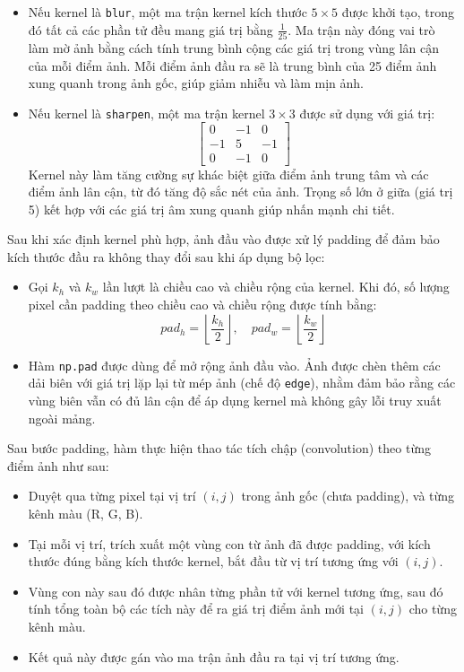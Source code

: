 \begin{itemize}
  \item Nếu kernel là \texttt{blur}, một ma trận kernel kích thước \(5 \times 5\) được khởi tạo, trong đó tất cả các phần tử đều mang giá trị bằng \(\frac{1}{25}\). Ma trận này đóng vai trò làm mờ ảnh bằng cách tính trung bình cộng các giá trị trong vùng lân cận của mỗi điểm ảnh. Mỗi điểm ảnh đầu ra sẽ là trung bình của 25 điểm ảnh xung quanh trong ảnh gốc, giúp giảm nhiễu và làm mịn ảnh.

  \item Nếu kernel là \texttt{sharpen}, một ma trận kernel \(3 \times 3\) được sử dụng với giá trị:
        \[
          \begin{bmatrix}
            0  & -1 & 0  \\
            -1 & 5  & -1 \\
            0  & -1 & 0
          \end{bmatrix}
        \]
        Kernel này làm tăng cường sự khác biệt giữa điểm ảnh trung tâm và các điểm ảnh lân cận, từ đó tăng độ sắc nét của ảnh. Trọng số lớn ở giữa (giá trị 5) kết hợp với các giá trị âm xung quanh giúp nhấn mạnh chi tiết.
\end{itemize}

Sau khi xác định kernel phù hợp, ảnh đầu vào được xử lý padding để đảm bảo kích thước đầu ra không thay đổi sau khi áp dụng bộ lọc:

\begin{itemize}
  \item Gọi \(k_h\) và \(k_w\) lần lượt là chiều cao và chiều rộng của kernel. Khi đó, số lượng pixel cần padding theo chiều cao và chiều rộng được tính bằng:
        \[
          pad_h = \left\lfloor \frac{k_h}{2} \right\rfloor, \quad pad_w = \left\lfloor \frac{k_w}{2} \right\rfloor
        \]
  \item Hàm \texttt{np.pad} được dùng để mở rộng ảnh đầu vào. Ảnh được chèn thêm các dải biên với giá trị lặp lại từ mép ảnh (chế độ \texttt{edge}), nhằm đảm bảo rằng các vùng biên vẫn có đủ lân cận để áp dụng kernel mà không gây lỗi truy xuất ngoài mảng.
\end{itemize}

Sau bước padding, hàm thực hiện thao tác tích chập (convolution) theo từng điểm ảnh như sau:

\begin{itemize}
  \item Duyệt qua từng pixel tại vị trí \((i, j)\) trong ảnh gốc (chưa padding), và từng kênh màu (R, G, B).
  \item Tại mỗi vị trí, trích xuất một vùng con từ ảnh đã được padding, với kích thước đúng bằng kích thước kernel, bắt đầu từ vị trí tương ứng với \((i, j)\).
  \item Vùng con này sau đó được nhân từng phần tử với kernel tương ứng, sau đó tính tổng toàn bộ các tích này để ra giá trị điểm ảnh mới tại \((i, j)\) cho từng kênh màu.
  \item Kết quả này được gán vào ma trận ảnh đầu ra tại vị trí tương ứng.
\end{itemize}

